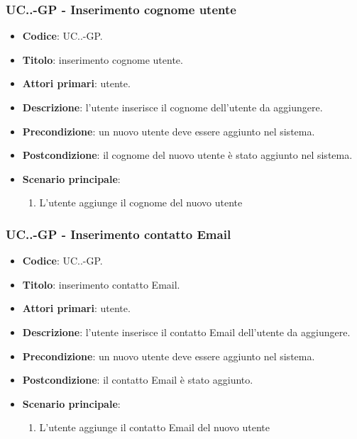		\subsubsection{UC\theuccount.\thesubuccount.\thesubsubuccount-GP - Inserimento cognome utente}
			
			\begin{itemize}
				\item \textbf{Codice}: UC\theuccount.\thesubuccount.\thesubsubuccount-GP.
				\item \textbf{Titolo}: inserimento cognome utente.
				\item \textbf{Attori primari}: utente.
				\item \textbf{Descrizione}: l'utente inserisce il cognome dell'utente da aggiungere.
				\item \textbf{Precondizione}: un nuovo utente deve essere aggiunto nel sistema.
				\item \textbf{Postcondizione}: il cognome del nuovo utente è stato aggiunto nel sistema.
				\item \textbf{Scenario principale}:
				\begin{enumerate}
					\item L'utente aggiunge il cognome del nuovo utente
				\end{enumerate}
			\end{itemize}
		
		\subsubsection{UC\theuccount.\thesubuccount.\thesubsubuccount-GP - Inserimento contatto Email}
			
			\begin{itemize}
				\item \textbf{Codice}: UC\theuccount.\thesubuccount.\thesubsubuccount-GP.
				\item \textbf{Titolo}: inserimento contatto Email.
				\item \textbf{Attori primari}: utente.
				\item \textbf{Descrizione}: l'utente inserisce il contatto Email dell'utente da aggiungere.
				\item \textbf{Precondizione}: un nuovo utente deve essere aggiunto nel sistema.
				\item \textbf{Postcondizione}: il contatto Email è stato aggiunto.
				\item \textbf{Scenario principale}:
				\begin{enumerate}
					\item L'utente aggiunge il contatto Email del nuovo utente
				\end{enumerate}
		\end{itemize}
		
